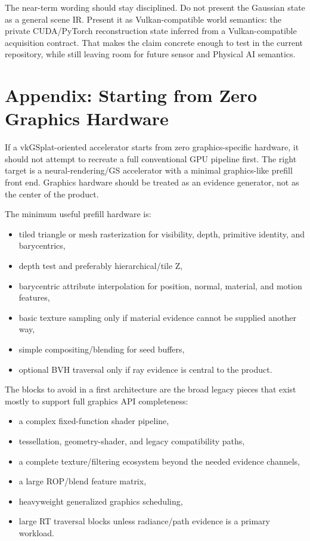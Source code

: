 \documentclass[11pt]{article}
\begin{document}
The near-term wording should stay disciplined. Do not present the Gaussian
state as a general scene IR. Present it as Vulkan-compatible world semantics:
the private CUDA/PyTorch reconstruction state inferred from a
Vulkan-compatible acquisition contract. That makes the claim concrete enough to
test in the current repository, while still leaving room for future sensor and
Physical AI semantics.

\appendix

\section{Appendix: Starting from Zero Graphics Hardware}

If a vkGSplat-oriented accelerator starts from zero graphics-specific hardware,
it should not attempt to recreate a full conventional GPU pipeline first. The
right target is a neural-rendering/GS accelerator with a minimal graphics-like
prefill front end. Graphics hardware should be treated as an evidence generator,
not as the center of the product.

The minimum useful prefill hardware is:

\begin{itemize}
  \item tiled triangle or mesh rasterization for visibility, depth, primitive
        identity, and barycentrics,
  \item depth test and preferably hierarchical/tile Z,
  \item barycentric attribute interpolation for position, normal, material, and
        motion features,
  \item basic texture sampling only if material evidence cannot be supplied
        another way,
  \item simple compositing/blending for seed buffers,
  \item optional BVH traversal only if ray evidence is central to the product.
\end{itemize}

The blocks to avoid in a first architecture are the broad legacy pieces that
exist mostly to support full graphics API completeness:

\begin{itemize}
  \item a complex fixed-function shader pipeline,
  \item tessellation, geometry-shader, and legacy compatibility paths,
  \item a complete texture/filtering ecosystem beyond the needed evidence
        channels,
  \item a large ROP/blend feature matrix,
  \item heavyweight generalized graphics scheduling,
  \item large RT traversal blocks unless radiance/path evidence is a primary
        workload.
\end{itemize}
\end{document}
